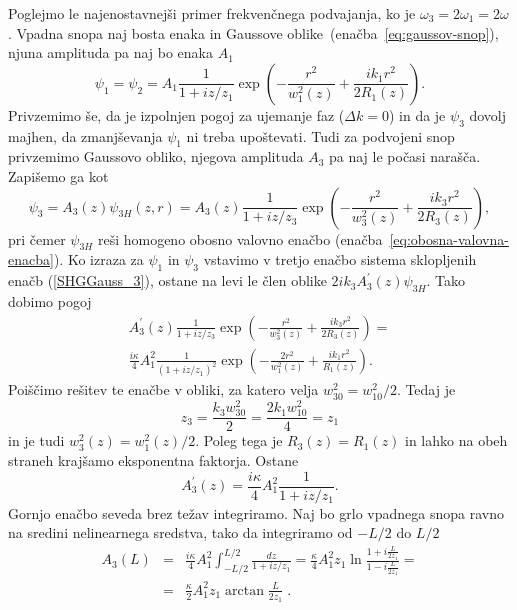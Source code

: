 Poglejmo le najenostavnejši primer frekvenčnega podvajanja, ko je 
$\omega_{3}=2\omega_{1}=2\omega$.
Vpadna snopa naj bosta enaka in Gaussove oblike~(enačba~\ref{eq:gaussov-snop}), 
njuna amplituda pa naj bo enaka $A_1$
\begin{equation}
\psi_{1} = \psi_2 = A_{1}\frac{1}{1+iz/z_1}
\exp\left(-\frac{r^{2}}{w_1^{2}(z)}+\frac{ik_1r^{2}}{2R_1(z)}\right).
\label{8.21}
\end{equation}
Privzemimo še, da je izpolnjen pogoj za ujemanje faz ($\Delta k=0$) in da je $\psi_{3}$ dovolj majhen, da zmanjševanja $\psi_{1}$
ni treba upoštevati. Tudi za podvojeni snop privzemimo Gaussovo 
obliko, njegova amplituda $A_3$ pa naj le počasi narašča. Zapišemo ga kot
\begin{equation}
\psi_{3}=A_{3}(z)\psi_{3H}(z,r)=A_{3}(z)\frac{1}{1+iz/z_{3}}
\exp\left(-\frac{r^{2}}{w_{3}^{2}(z)}+\frac{ik_{3}r^{2}}{2R_{3}(z)}\right),
\label{8.22}
\end{equation}
pri čemer $\psi_{3H}$ reši homogeno obosno valovno 
enačbo (enačba~\ref{eq:obosna-valovna-enacba}). Ko izraza za $\psi_{1}$
in $\psi_{3}$ vstavimo v tretjo enačbo sistema sklopljenih enačb (\ref{SHGGauss_3}),
ostane na levi le člen oblike $2ik_{3}A_{3}^{\prime}(z)\psi_{3H}$. Tako dobimo pogoj
\begin{multline}
A_{3}^{\prime}(z)\frac{1}{1+iz/z_3}\exp\left(-\frac{r^{2}}{w_{3}^{2}(z)}+\frac{ik_{3}r^{2}}
{2R_{3}(z)}\right)=\\
\frac{i\kappa}{4}A_{1}^{2}\frac{1}{(1+iz/z_{1})^{2}}\exp\left(-\frac{2r^{2}}
{w_{1}^{2}(z)}+\frac{ik_{1}r^{2}}{R_{1}(z)}\right).
\label{8.23}
\end{multline}
Poiščimo rešitev te enačbe v obliki, za katero velja $w_{30}^{2}=w_{10}^{2}/2$. Tedaj je 
\begin{equation}
z_{3}=\frac{k_{3}w_{30}^{2}}{2}=\frac{2k_{1}w_{10}^{2}}{4}=z_{1}
\end{equation}
in je tudi $w_{3}^{2}(z)=w_{1}^{2}(z)/2$. Poleg tega je $R_{3}(z)=R_{1}(z)$
in lahko na obeh straneh krajšamo eksponentna faktorja. Ostane 
\begin{equation}
A_{3}^{\prime}(z)=\frac{i\kappa}{4}A_{1}^{2}\frac{1}{1+iz/z_1}.
\label{8.24}
\end{equation}
Gornjo enačbo seveda brez težav integriramo. Naj bo grlo vpadnega
snopa ravno na sredini nelinearnega sredstva, tako da integriramo
od $-L/2$ do $L/2$
\begin{eqnarray}
A_{3}(L) & = & \frac{i\kappa}{4}A_{1}^{2}\int_{-L/2}^{L/2}\frac{dz}{1+iz/z_1} 
  = \frac{\kappa}{4}A_{1}^{2}z_{1}\ln\frac{1+i\frac{L}{2z_{1}}}{1-i\frac{L}{2z_{1}}}= \nonumber \\
 & = & \frac{\kappa}{2}A_{1}^{2}z_{1}\arctan\frac{L}{2z_{1}}\;.
\end{eqnarray}
